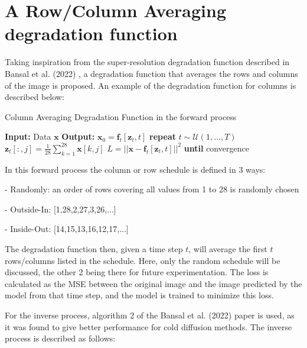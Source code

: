 \documentclass[12pt]{report} %
\begin{document}
\section{A Row/Column Averaging degradation function}

Taking inspiration from the super-resolution degradation function described in Bansal et al. (2022) \cite{bansal2022cold}, a degradation function that averages the rows and columns of the image is proposed. An example of the degradation function for columns is described below:

\begin{definitionbox}{Column Averaging Degradation Function in the forward process}
  \begin{algorithmic}[1]
    \State \textbf{Input:} Data $\mathbf{x}$
    \State \textbf{Output:} $\mathbf{x}_{0} = \mathbf{f}_{t}[\mathbf{z}_{t}, t]$
    \State \textbf{repeat}
       
        \State $t \sim \mathcal{U}(1, \dots, T)$ 
         
          \State $\mathbf{z}_{t}[:, j] = \frac{1}{\text{28}}\sum_{k=1}^{28}\mathbf{x}[k, j]$
        \EndFor
        \State $L = ||\mathbf{x} - \mathbf{f}_{t}[\mathbf{z}_{t}, t]||^{2}$ 
      \EndFor {}
    \State \textbf{until} convergence
  \end{algorithmic}
\end{definitionbox}

In this forward process the column or row schedule is defined in 3 ways:

- Randomly: an order of rows covering all values from 1 to 28 is randomly chosen

- Outside-In: [1,28,2,27,3,26,...]

- Inside-Out: [14,15,13,16,12,17,...]


The degradation function then, given a time step $t$, will average the first $t$ rows/columns listed in the schedule. Here, only the random schedule will be discussed, the other 2 being there for future experimentation. The loss is calculated as the MSE between the original image and the image predicted by the model from that time step, and the model is trained to minimize this loss.

For the inverse process, algorithm 2 of the Bansal et al. (2022) paper is used, as it was found to give better performance for cold diffusion methods\cite[p. 4]{bansal2022cold}. The inverse process is described as follows:
\end{document}
